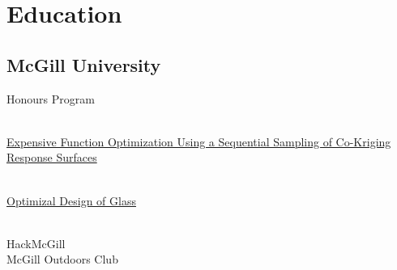 \documentclass[letterpaper]{deedy-resume} %
\begin{document}



\begin{minipage}[t]{0.33\textwidth} %


\section{Education}

\subsection{McGill University}
Honours Program

\insectionspace
{} \\
\href{https://dl.dropboxusercontent.com/u/14503566/thesis.pdf}{Expensive Function Optimization Using a Sequential Sampling
of Co-Kriging Response Surfaces}

\insectionspace
{} \\
\href{https://dl.dropboxusercontent.com/u/14503566/thesis.pdf}{Optimizal
Design of Glass}

\insectionspace
{} \\
HackMcGill \\
McGill Outdoors Club
\sectionspace %



\end{minipage}
\end{document}
